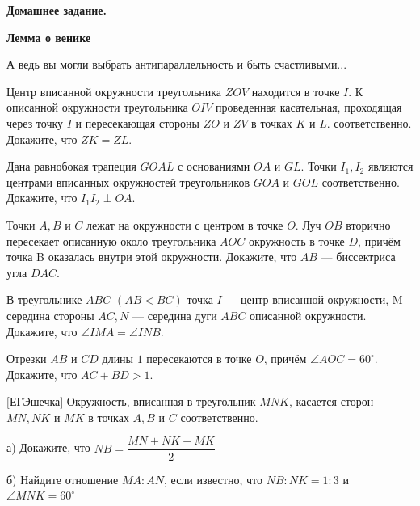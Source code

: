\centerline{\bf \Huge Домашнее задание.}
\centerline{\bf \Huge Лемма о венике}

\begin{flushright}
        \scriptsize{А ведь вы могли выбрать антипараллельность и быть счастливыми...}
\end{flushright}


Центр вписанной окружности треугольника $ZOV$ находится в точке $I$.
К описанной окружности треугольника $OIV$ проведенная касательная, проходящая через точку $I$ и пересекающая стороны $ZO$ и $ZV$ в точках $K$ и $L$. соответственно. Докажите, что $ZK = ZL$.

Дана равнобокая трапеция $GOAL$ с основаниями $OA$ и $GL$. Точки $I_1, I_2$ являются центрами вписанных окружностей треугольников $GOA$ и $GOL$ соответственно. Докажите, что $I_1I_2 \perp OA.$

Точки $A,B$ и $C$   лежат на окружности с центром в точке $O$. Луч $OB$   вторично пересекает описанную около треугольника $AOC$ окружность в точке $D$,   причём точка B   оказалась внутри этой окружности. Докажите, что $AB$ --- биссектриса угла $DAC$.

В треугольнике $ABC$ $( AB < BC)$  точка $I$ --- центр вписанной окружности, M – середина стороны $AC, N$ --- середина дуги $ABC$ описанной окружности.
Докажите, что  $\angle IMA = \angle INB$.

Отрезки $AB$ и $CD$ длины $1$ пересекаются в точке $O$, причём $\angle AOC = 60^{\circ}$. Докажите, что $AC + BD > 1$.

$\bigl[\textbf{ЕГЭшечка}\bigr]$
Окружность, вписанная в треугольник $MNK$, касается сторон $MN, NK$ и $MK$ в точках $A, B$ и $C$ соответственно.

а) Докажите, что $NB = \dfrac{MN+NK-MK}{2}$

б) Найдите отношение $MA:AN$, если известно, что $NB:NK = 1:3$ и $\angle MNK = 60^{\circ}$